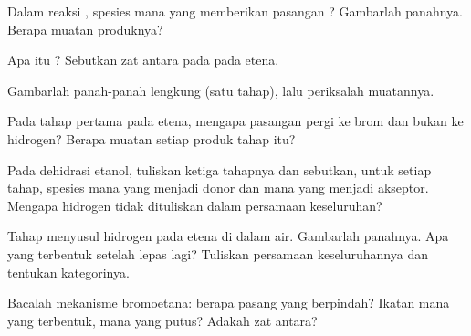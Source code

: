 \begin{exercise}[$\star$]\label{exo:g12:curly-arrows:4}
Dalam reaksi , spesies mana yang memberikan
pasangan ? Gambarlah panahnya. Berapa muatan produknya?
\end{exercise}

\begin{exercise}[$\star$]\label{exo:g12:curly-arrows:5}
Apa itu ? Sebutkan zat antara pada  
pada etena.
\end{exercise}

\begin{exercise}[$\star\star$]\label{exo:g12:curly-arrows:6}
Gambarlah panah-panah lengkung 
 (satu tahap), lalu periksalah
muatannya.
\end{exercise}

\begin{exercise}[$\star\star$]\label{exo:g12:curly-arrows:7}
Pada tahap pertama   pada etena, mengapa pasangan 
pergi ke brom dan bukan ke hidrogen? Berapa muatan setiap produk tahap
itu?
\end{exercise}

\begin{exercise}[$\star\star$]\label{exo:g12:curly-arrows:8}
Pada dehidrasi etanol, tuliskan ketiga tahapnya dan sebutkan, untuk
setiap tahap, spesies mana yang menjadi donor dan mana yang menjadi
akseptor. Mengapa  hidrogen tidak dituliskan dalam persamaan
keseluruhan?
\end{exercise}

\begin{exercise}[$\star\star$]\label{exo:g12:curly-arrows:9}
Tahap  menyusul   hidrogen
pada etena di dalam air. Gambarlah panahnya. Apa yang terbentuk setelah
 lepas lagi? Tuliskan persamaan keseluruhannya dan tentukan
kategorinya.
\end{exercise}

\begin{exercise}[$\star\star$]\label{exo:g12:curly-arrows:10}
Bacalah mekanisme  bromoetana: berapa pasang  yang
berpindah? Ikatan mana yang terbentuk, mana yang putus? Adakah zat
antara?
\end{exercise}

